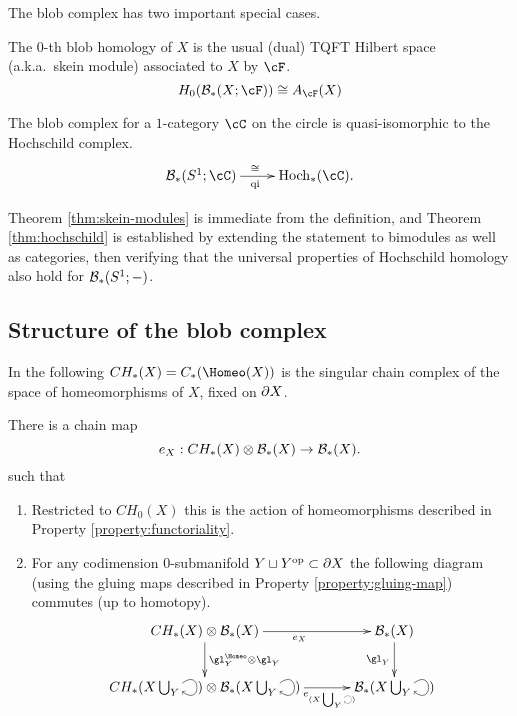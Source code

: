 \documentclass{pnastwo}
\begin{document}
\begin{article}
The blob complex has two important special cases.

\begin{thm}
\label{thm:skein-modules}
The $0$-th blob homology of $X$ is the usual 
(dual) TQFT Hilbert space (a.k.a.\ skein module) associated to $X$
by $\cF$.
\begin{equation*}
H_0(\bc_*(X;\cF)) \iso A_{\cF}(X)
\end{equation*}
\end{thm}

\begin{thm}[Hochschild homology when $X=S^1$]
\label{thm:hochschild}
The blob complex for a $1$-category $\cC$ on the circle is
quasi-isomorphic to the Hochschild complex.
\begin{equation*}
\xymatrix{\bc_*(S^1;\cC) \ar[r]^(0.47){\iso}_(0.47){\text{qi}} & \HC_*(\cC).}
\end{equation*}
\end{thm}

Theorem \ref{thm:skein-modules} is immediate from the definition, and
Theorem \ref{thm:hochschild} is established by extending the statement to bimodules as well as categories, then verifying that the universal properties of Hochschild homology also hold for ${\mathcal B}_*(S^1; -)$.


\subsection{Structure of the blob complex}
\label{sec:structure}

In the following $\CH{X} = C_*(\Homeo(X))$ is the singular chain complex of the space of homeomorphisms of $X$, fixed on $\partial X$.

\begin{thm}
\label{thm:CH}\label{thm:evaluation}
There is a chain map
\begin{equation*}
e_X: CH_*(X) \otimes {\mathcal B}_*(X) \to {\mathcal B}_*(X).
\end{equation*}
such that
\begin{enumerate}
\item Restricted to $CH_0(X)$ this is the action of homeomorphisms described in Property \ref{property:functoriality}. 

\item For
any codimension $0$-submanifold $Y \sqcup Y^\text{op} \subset \partial X$ the following diagram
(using the gluing maps described in Property \ref{property:gluing-map}) commutes (up to homotopy).
\begin{equation*}
\xymatrix@C+0.3cm{
     \CH{X} \otimes \bc_*(X)
        \ar[r]_{e_{X}}  \ar[d]^{\gl^{\Homeo}_Y \otimes \gl_Y}  &
            \bc_*(X) \ar[d]_{\gl_Y} \\
     \CH{X \bigcup_Y \selfarrow} \otimes \bc_*(X \bigcup_Y \selfarrow) \ar[r]_<<<<<<<{e_{(X \bigcup_Y \scalebox{0.5}{\selfarrow})}}    & \bc_*(X \bigcup_Y \selfarrow)
}
\end{equation*}
\end{enumerate}


\end{thm}
\end{article}
\end{document}

